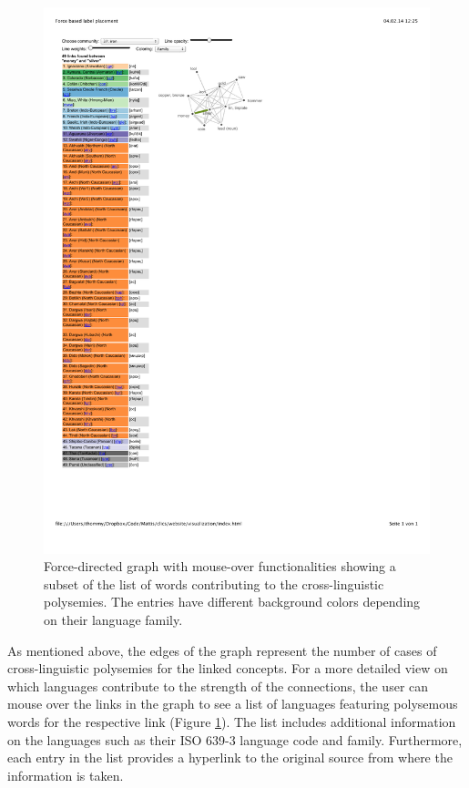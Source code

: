 \begin{figure}[htbp]
\begin{center}
\includegraphics[width=\textwidth]{img/moneysilver.pdf}
\caption{Force-directed graph with mouse-over functionalities showing a subset of the list of words contributing to the cross-linguistic polysemies. The entries have different background colors depending on their language family.}
\label{MoneySilver}
\end{center}
\end{figure}




As mentioned above, the edges of the graph represent the number of cases of cross-linguistic polysemies for the linked concepts. For a more detailed view on which languages contribute to the strength of the connections, the user can mouse over the links in the graph to see a list of  languages featuring polysemous words for the respective link (Figure \ref{MoneySilver}). The list includes additional information on the languages such as their ISO 639-3 language code and family. Furthermore, each entry in the list provides a hyperlink to the original source from where the information is taken.  

